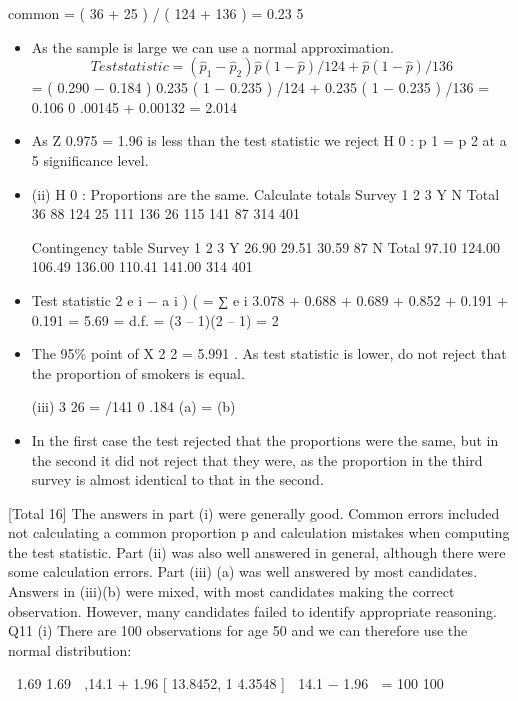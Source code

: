 \documentclass[a4paper,12pt]{article}
\begin{document}
\begin{enumerate}
common  = ( 36 + 25 ) / ( 124 + 136 ) = 0.23 5

\begin{itemize}
\item As the sample is large we can use a normal approximation.
\[Test statistic =
( \hat{p}_1 − \hat{p}_2 )
\hat{p} (1 − \hat{p} ) /124 + \hat{p} (1 − \hat{p} ) /136\]
= ( 0.290 − 0.184 )
0.235 ( 1 − 0.235 ) /124 + 0.235 ( 1 − 0.235 ) /136
= 0.106
0 .00145 + 0.00132
= 2.014

\item As Z 0.975 = 1.96 is less than the test statistic we reject H 0 : p 1 = p 2 at a 5%
significance level.

\item (ii)
H 0 : Proportions are the same.
Calculate totals
Survey 1 2 3
Y
N
Total 36
88
124 25
111
136 26
115
141
87
314
401

Contingency table
Survey 1 2 3
Y 26.90 29.51 30.59
87
N
Total
97.10
124.00
106.49
136.00
110.41
141.00
314
401

\item Test statistic
2
e i − a i )
(
=
∑
e i
3.078 + 0.688 + 0.689 + 0.852 + 0.191 + 0.191 =
5.69
=
d.f. = (3 – 1)(2 – 1) = 2


\item The 95\%  point of X 2 2 = 5.991 . As test statistic is lower, do not reject that the
proportion of smokers is equal.

(iii)
 3 26
=
/141 0 .184
(a) =
(b)

\item In the first case the test rejected that the proportions were the same, but
in the second it did not reject that they were, as the proportion in the
third survey is almost identical to that in the second.
\end{itemize}
[Total 16]
The answers in part (i) were generally good. Common errors included not calculating a common proportion p and calculation mistakes when
computing the test statistic. Part (ii) was also well answered in general, although there were some calculation errors. Part (iii) (a) was well
answered by most candidates. Answers in (iii)(b) were mixed, with most candidates making the correct observation. However, many candidates
failed to identify appropriate reasoning.
\newpage
Q11
(i)
There are 100 observations for age 50 and we can therefore use the normal distribution:


1.69
1.69 
,14.1 + 1.96
[ 13.8452, 1 4.3548 ]
 14.1 − 1.96
 =
100
100




\end{enumerate}
\end{document}
